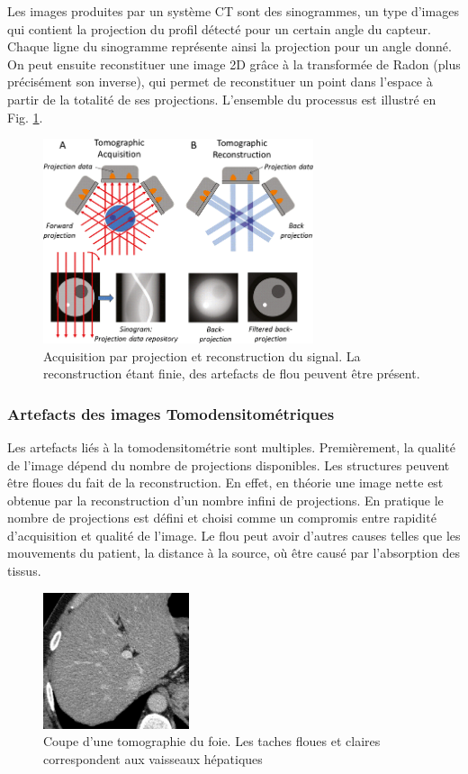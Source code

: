 Les images produites par un système CT sont des sinogrammes, un type d'images qui contient la projection du profil détecté pour un certain angle du capteur. Chaque ligne du sinogramme représente ainsi la projection pour un angle donné. On peut ensuite reconstituer une image 2D grâce à la transformée de Radon (plus précisément son inverse), qui permet de reconstituer un point dans l'espace à partir de la totalité de ses projections. L'ensemble du processus est illustré en Fig. \ref{fig:tomography}.

\begin{figure}
    \centering
    \includegraphics[height=6cm]{Images/Tomo_projection.png}
    \caption{Acquisition par projection et reconstruction du signal. La reconstruction étant finie, des artefacts de flou peuvent être présent.}
    \label{fig:tomography}
\end{figure}

\subsubsection{Artefacts des images Tomodensitométriques}

Les artefacts liés à la tomodensitométrie sont multiples. Premièrement, la qualité de l'image dépend du nombre de projections disponibles. Les structures peuvent être floues du fait de la reconstruction. En effet, en théorie une image nette est obtenue par la reconstruction d'un nombre infini de projections. En pratique le nombre de projections est défini et choisi comme un compromis entre rapidité d'acquisition et qualité de l'image. Le flou peut avoir d'autres causes telles que les mouvements du patient, la distance à la source, où être causé par l'absorption des tissus. 

\begin{figure}
    \centering
    \includegraphics[height=4cm]{Images/blury_vessels.png}
    \caption{Coupe d'une tomographie du foie. Les taches floues et claires  correspondent aux vaisseaux hépatiques}
    \label{fig:CT_blur}
\end{figure}

